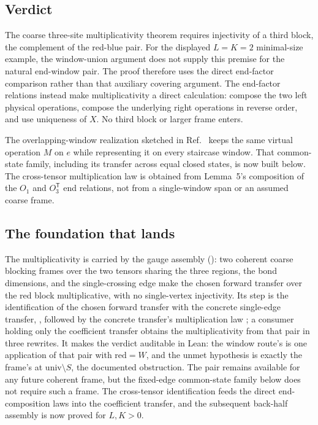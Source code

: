\documentclass{article}
\begin{document}
\subsection{Verdict}

The coarse three-site multiplicativity theorem requires injectivity of a
third block, the complement of the red-blue pair. For the displayed
$L=K=2$ minimal-size example, the window-union argument does not supply
this premise for the natural end-window pair. The proof therefore uses
the direct end-factor comparison rather than that auxiliary covering
argument. The end-factor
relations instead make multiplicativity a direct calculation: compose the two
left physical operations, compose the underlying right operations in reverse
order, and use uniqueness of $X$.  No third block or larger frame enters.

The overlapping-window realization sketched in Ref.~\cite{Molnar2018NormalPEPS} keeps the same
virtual operation $M$ on $e$ while representing it on every staircase window.
That common-state family, including its transfer across equal closed states,
is now built below.  The cross-tensor multiplication law is obtained from
Lemma~5's composition of the $O_1$ and $O_3^{\mathsf T}$ end relations, not
from a single-window span or an assumed coarse frame.

\subsection{The foundation that lands}

The multiplicativity is carried by the gauge assembly
(): two coherent coarse blocking
frames over the two tensors sharing the three regions, the bond dimensions, and the
single-crossing edge make the chosen forward transfer over the red block
multiplicative, with no single-vertex injectivity. Its  step is the
identification of the chosen forward transfer with the concrete single-edge transfer,
, followed by the concrete
transfer's multiplication law ; a consumer
holding only the coefficient transfer obtains the multiplicativity from that pair in
three rewrites. It makes the verdict auditable in Lean: the window route's
 is one application of that pair with $\mathrm{red}=W$, and the unmet
hypothesis is exactly the frame's  at
$\mathrm{univ}\setminus S$, the documented obstruction.  The pair remains available for
any future coherent frame, but the
fixed-edge common-state family below does not require such a frame.
The cross-tensor identification feeds the direct end-composition laws into
the coefficient transfer, and the subsequent back-half assembly is now
proved for $L,K>0$.
\end{document}
